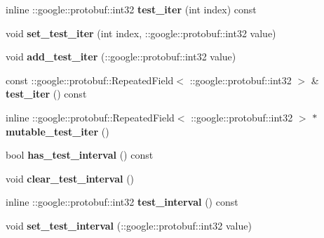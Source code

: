 \begin{DoxyCompactItemize}
\item 
\mbox{\label{classcaffe_1_1_solver_parameter_a4b31aea91db0736e4517cc553725cc02}} 
inline \+::google\+::protobuf\+::int32 {\bfseries test\+\_\+iter} (int index) const
\item 
\mbox{\label{classcaffe_1_1_solver_parameter_a317a0065a016b7a9e7ba5c776227e737}} 
void {\bfseries set\+\_\+test\+\_\+iter} (int index, \+::google\+::protobuf\+::int32 value)
\item 
\mbox{\label{classcaffe_1_1_solver_parameter_a5051dc16feb74c68ed47579e0853e996}} 
void {\bfseries add\+\_\+test\+\_\+iter} (\+::google\+::protobuf\+::int32 value)
\item 
\mbox{\label{classcaffe_1_1_solver_parameter_a2033b8556952961bd40c45f1df38241f}} 
const \+::google\+::protobuf\+::\+Repeated\+Field$<$ \+::google\+::protobuf\+::int32 $>$ \& {\bfseries test\+\_\+iter} () const
\item 
\mbox{\label{classcaffe_1_1_solver_parameter_abe0c0fe9331b5b71ec5b4840ac8a9ba1}} 
inline \+::google\+::protobuf\+::\+Repeated\+Field$<$ \+::google\+::protobuf\+::int32 $>$ $\ast$ {\bfseries mutable\+\_\+test\+\_\+iter} ()
\item 
\mbox{\label{classcaffe_1_1_solver_parameter_a7b473e6a41044d8d6cf7ba1a120b3add}} 
bool {\bfseries has\+\_\+test\+\_\+interval} () const
\item 
\mbox{\label{classcaffe_1_1_solver_parameter_ac3e6c2a684d7d525c6742301e4c06263}} 
void {\bfseries clear\+\_\+test\+\_\+interval} ()
\item 
\mbox{\label{classcaffe_1_1_solver_parameter_a5ba21f5cdf7cc0c0478338922ef463f5}} 
inline \+::google\+::protobuf\+::int32 {\bfseries test\+\_\+interval} () const
\item 
\mbox{\label{classcaffe_1_1_solver_parameter_a536c67317f2e5ec13361ac4dfd82aec3}} 
void {\bfseries set\+\_\+test\+\_\+interval} (\+::google\+::protobuf\+::int32 value)

\end{DoxyCompactItemize}
